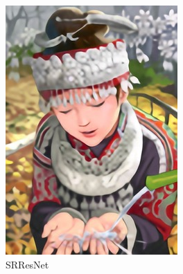 \begin{figure}[t]
\begin{subfigure}{.24\linewidth}
        \includegraphics[width=\linewidth]{images/comic_SRResNet-MSE.jpg}
        \caption{SRResNet}
        \label{fig:srgan_srresnet}
    \end{subfigure}
    \begin{subfigure}{.24\linewidth}

\end{subfigure}
\end{figure}
